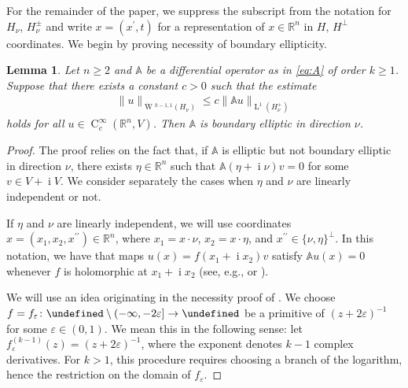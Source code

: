 \documentclass[a4paper,10pt]{amsart}
\let\C\undefined
\newcommand{\R}{\mathbb R}
\renewcommand{\leq}{\leqslant}
\newcommand{\lebe}{\operatorname{L}}
\newcommand{\sobo}{\operatorname{W}}
\newcommand{\imag}{\operatorname{i}}
\newcommand{\hold}{\operatorname{C}}
\newcommand{\A}{\mathbb{A}}
\newcommand{\C}{\mathbb{C}}
\numberwithin{equation}{section}
\newtheorem{lemma}[theorem]{Lemma}
\theoremstyle{remark}
\numberwithin{equation}{section}
\begin{document}
	
	For the remainder of the paper, we suppress the subscript from the notation for $H_\nu$, $H^\pm_\nu$ and write $x=(x^\prime,t)$ for a representation of $x\in\R^n$ in $H,\,H^\perp$ coordinates.
	We begin by proving necessity of boundary ellipticity. 
	\begin{lemma}\label{lem:nec_bdry_ell}
		Let \(n \ge 2\) and $\A$ be a differential operator as in \eqref{eq:A}   of order $k\geq 1$. Suppose that
		there exists a constant $c>0$ such that the estimate
		\begin{align}\label{eq:bogoargentino}
			\|u\|_{\dot{\sobo}{^{k-1,1}}(H_\nu)}\leq c\|\A u\|_{\lebe^1(H_\nu^+)}
		\end{align}
		holds for all $u\in\hold^\infty_c(\R^n,V)$. Then $\A$ is boundary elliptic in direction $\nu$.
	\end{lemma}
	\begin{proof}
		The proof relies on the fact that, if $\A$ is elliptic but not boundary elliptic in direction $\nu$, there exists $\eta\in\R^{n}$ such that $\A(\eta+\imag\nu)v=0$ for some $v\in V+\imag V$. 
		We consider separately the cases when $\eta$ and $\nu$ are linearly independent or not.
		
		\medbreak
		
		If $\eta$ and $\nu$ are linearly independent, we will use coordinates $x=(x_1,x_2,x^{\prime\prime})\in\R^n$, where $x_1=x\cdot\nu$, $x_2=x\cdot\eta$, and $x^{\prime\prime}\in\{\nu,\eta\}^\perp$.
		In this notation, we have that maps $u(x)=f(x_1+\imag x_2)v$ satisfy $\A u(x)=0$ whenever $f$ is holomorphic at $x_1+\imag x_2$ (see, e.g.,  \cite[Lem.~3.2]{GR} or \cite[Lem.~2.5]{BDG}).
		
		We will use an idea originating in the necessity proof of \cite[Thm.~V]{Aronszajn}. We choose $f=f_\varepsilon\colon\C\setminus(-\infty,-2\varepsilon]\rightarrow\C$ be a primitive of $(z+2\varepsilon)^{-1}$ for some $\varepsilon\in(0,1)$. We mean this in the following sense: let $f^{(k-1)}_\varepsilon(z)=(z+2\varepsilon)^{-1}$, where the exponent denotes $k-1$ complex derivatives. For $k>1$, this procedure requires choosing a branch of the logarithm, hence the restriction on the domain of $f_\varepsilon$.
		

\end{proof}
\end{document}
